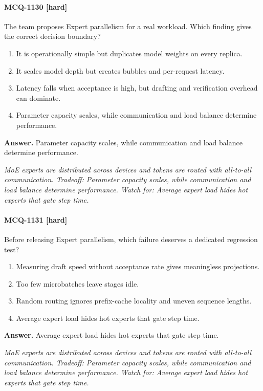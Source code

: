 \paragraph{MCQ-1130 [hard]} The team proposes Expert parallelism for a real workload. Which finding gives the correct decision boundary?
\begin{enumerate}[label=\Alph*.]
\item It is operationally simple but duplicates model weights on every replica.
\item It scales model depth but creates bubbles and per-request latency.
\item Latency falls when acceptance is high, but drafting and verification overhead can dominate.
\item Parameter capacity scales, while communication and load balance determine performance.
\end{enumerate}
\noindent\textbf{Answer.} Parameter capacity scales, while communication and load balance determine performance.
\par\textit{MoE experts are distributed across devices and tokens are routed with all-to-all communication. Tradeoff: Parameter capacity scales, while communication and load balance determine performance. Watch for: Average expert load hides hot experts that gate step time.}
\paragraph{MCQ-1131 [hard]} Before releasing Expert parallelism, which failure deserves a dedicated regression test?
\begin{enumerate}[label=\Alph*.]
\item Measuring draft speed without acceptance rate gives meaningless projections.
\item Too few microbatches leave stages idle.
\item Random routing ignores prefix-cache locality and uneven sequence lengths.
\item Average expert load hides hot experts that gate step time.
\end{enumerate}
\noindent\textbf{Answer.} Average expert load hides hot experts that gate step time.
\par\textit{MoE experts are distributed across devices and tokens are routed with all-to-all communication. Tradeoff: Parameter capacity scales, while communication and load balance determine performance. Watch for: Average expert load hides hot experts that gate step time.}
